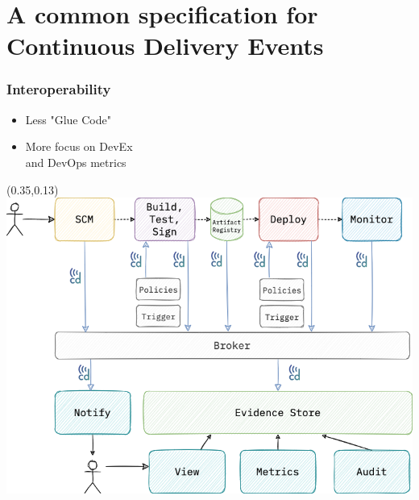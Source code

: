 \documentclass[aspectratio=169,11pt,hyperref={colorlinks=true}]{beamer}
\begin{document}
\section[CDEvents]{A common specification for Continuous Delivery Events}

\begin{sectionwithpicmediumcentral}{}
\end{sectionwithpicmediumcentral}

\begin{grayframe}
  \frametitle{Interoperability}
  \begin{itemize}
    \item Less "Glue Code"
    \item More focus on DevEx \\
          and DevOps metrics
  \end{itemize}
  \begin{textblock*}{0.60\paperwidth}(0.35\paperwidth,0.13\paperheight)
    \includegraphics[width=0.60\paperwidth]{img/cdevents-4-Interoperability.png}
  \end{textblock*}
\end{grayframe}
\end{document}
